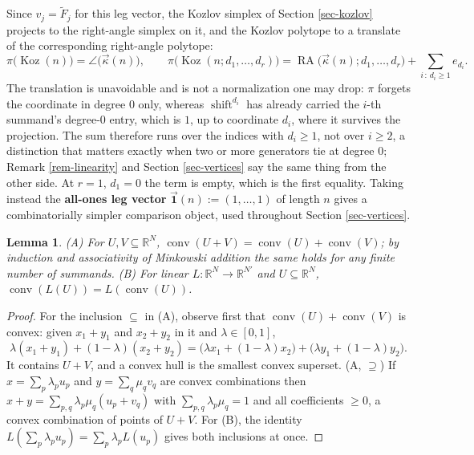 \documentclass[11pt, a4paper, abstract=yes]{scrartcl}
\theoremstyle{definition}
\theoremstyle{remark}
\theoremstyle{plain}
\newtheorem{lemma}[definition]{Lemma}
\newcommand{\Koz}{\operatorname{Koz}}
\newcommand{\shift}{\operatorname{shift}}
\newcommand{\rasimp}{\angle}
\newcommand{\RA}{\operatorname{RA}}
\newcommand{\kozvec}{\vec\kappa}
\newcommand{\proj}{\pi}
\newcommand{\onesvec}{\vec{\mathbf 1}}
\newcommand{\leannone}{\tikz[baseline=-0.6ex]\draw[leannone,line width=0.6pt] (0,0) circle (0.55ex);}
\newcommand{\leanmark}[1]{\leavevmode{\reversemarginpar\marginnote{\raggedleft#1}}}
\newcommand{\conv}{\operatorname{conv}}
\begin{document}
Since \(v_j=\tilde F_j\) for this leg vector, the Kozlov simplex of Section \ref{sec-kozlov} projects
to the right-angle simplex on it, and the Kozlov polytope to a translate of the corresponding
right-angle polytope:
\begin{equation}\label{eq:koz-as-ra}
  \proj\bigl(\Koz(n)\bigr)=\rasimp\bigl(\kozvec(n)\bigr),\qquad
  \proj\bigl(\Koz(n;d_1,\dots,d_r)\bigr)=\RA\bigl(\kozvec(n);d_1,\dots,d_r\bigr)
     +\sum_{i\,:\,d_i\ge1}e_{d_i} .
\end{equation}
The translation is unavoidable and is not a normalization one may drop: \(\proj\) forgets the
coordinate in degree \(0\) only, whereas \(\shift^{d_i}\) has already carried the \(i\)-th summand's
degree-\(0\) entry, which is \(1\), up to coordinate \(d_i\), where it survives the projection.
The sum therefore runs over the indices with \(d_i\ge1\), not over \(i\ge2\), a distinction that
matters exactly when two or more generators tie at degree \(0\); Remark \ref{rem-linearity} and
Section \ref{sec-vertices} say the same thing from the other side. At \(r=1\), \(d_1=0\) the term is
empty, which is the first equality. Taking instead the \textbf{all-ones leg vector}
\(\onesvec(n):=(1,\dots,1)\) of length \(n\) gives a
combinatorially simpler comparison object, used throughout Section \ref{sec-vertices}.

\begin{lemma}
\leanmark{\leannone}(A) For \(U,V\subseteq\mathbb R^N\), \(\conv(U+V)=\conv(U)+\conv(V)\); by induction and
associativity of Minkowski addition the same holds for any finite number of summands.
(B) For linear \(L:\mathbb R^N\to\mathbb R^{N'}\) and \(U\subseteq\mathbb R^N\),
\(\conv(L(U))=L(\conv(U))\).
\label{lem-convex}
\end{lemma}

\begin{proof}
For the inclusion \(\subseteq\) in (A), observe first that \(\conv(U)+\conv(V)\) is convex: given
\(x_1+y_1\) and \(x_2+y_2\) in it and \(\lambda\in[0,1]\),
\begin{equation}\label{eq:convex}
  \lambda(x_1+y_1)+(1-\lambda)(x_2+y_2)
  =\bigl(\lambda x_1+(1-\lambda)x_2\bigr)+\bigl(\lambda y_1+(1-\lambda)y_2\bigr).
\end{equation}
It contains \(U+V\), and a convex hull is the smallest convex superset. (A, \(\supseteq\)) If \(x=\sum_p\lambda_pu_p\) and \(y=\sum_q\mu_qv_q\) are convex
combinations then \(x+y=\sum_{p,q}\lambda_p\mu_q(u_p+v_q)\) with \(\sum_{p,q}\lambda_p\mu_q=1\) and
all coefficients \(\ge0\), a convex combination of points of \(U+V\).
For (B), the identity \(L(\sum_p\lambda_pu_p)=\sum_p\lambda_pL(u_p)\) gives both inclusions at
once.
\end{proof}
\end{document}
